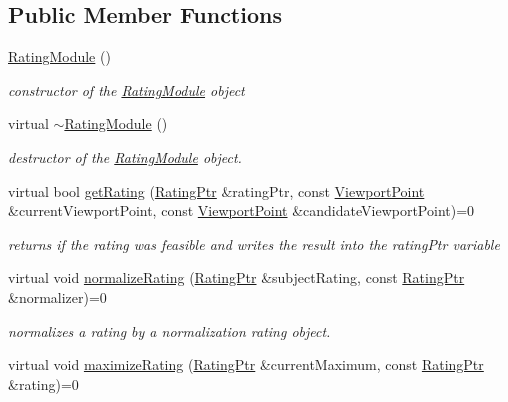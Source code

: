 \subsection*{\-Public \-Member \-Functions}
\begin{DoxyCompactItemize}
\item 
\hyperlink{classnext__best__view_1_1RatingModule_a22dd1d756ba21b3ad86110455c763b92}{\-Rating\-Module} ()
\begin{DoxyCompactList}\small\item\em constructor of the \hyperlink{classnext__best__view_1_1RatingModule}{\-Rating\-Module} object \end{DoxyCompactList}\item 
virtual \hyperlink{classnext__best__view_1_1RatingModule_aa82717711b7590bc6293a91d6e4ecf01}{$\sim$\-Rating\-Module} ()
\begin{DoxyCompactList}\small\item\em destructor of the \hyperlink{classnext__best__view_1_1RatingModule}{\-Rating\-Module} object. \end{DoxyCompactList}\item 
virtual bool \hyperlink{classnext__best__view_1_1RatingModule_ad979e53bbe8fea74eb4112e07d3a0ec2}{get\-Rating} (\hyperlink{namespacenext__best__view_a24cf26ec1dec2cc4c167e32798d1abeb}{\-Rating\-Ptr} \&rating\-Ptr, const \hyperlink{namespacenext__best__view_adc2a48dc71f39dea04334b16d75a8e34}{\-Viewport\-Point} \&current\-Viewport\-Point, const \hyperlink{namespacenext__best__view_adc2a48dc71f39dea04334b16d75a8e34}{\-Viewport\-Point} \&candidate\-Viewport\-Point)=0
\begin{DoxyCompactList}\small\item\em returns if the rating was feasible and writes the result into the rating\-Ptr variable \end{DoxyCompactList}\item 
virtual void \hyperlink{classnext__best__view_1_1RatingModule_ab24c85e3486432079ec6821a61b954bd}{normalize\-Rating} (\hyperlink{namespacenext__best__view_a24cf26ec1dec2cc4c167e32798d1abeb}{\-Rating\-Ptr} \&subject\-Rating, const \hyperlink{namespacenext__best__view_a24cf26ec1dec2cc4c167e32798d1abeb}{\-Rating\-Ptr} \&normalizer)=0
\begin{DoxyCompactList}\small\item\em normalizes a rating by a normalization rating object. \end{DoxyCompactList}\item 
virtual void \hyperlink{classnext__best__view_1_1RatingModule_abaed52bfc5bd246c69c945dc88f94866}{maximize\-Rating} (\hyperlink{namespacenext__best__view_a24cf26ec1dec2cc4c167e32798d1abeb}{\-Rating\-Ptr} \&current\-Maximum, const \hyperlink{namespacenext__best__view_a24cf26ec1dec2cc4c167e32798d1abeb}{\-Rating\-Ptr} \&rating)=0

\end{DoxyCompactItemize}
